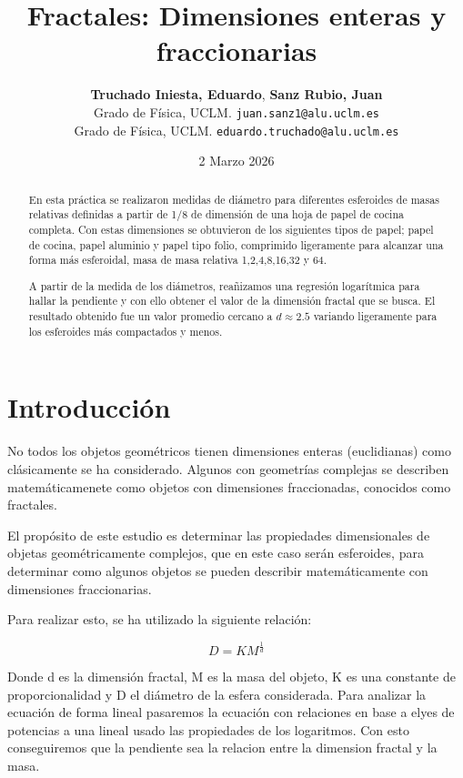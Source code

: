 \documentclass[11pt, a4paper, twocolumn]{article}
\title{\textbf{\Large Fractales: Dimensiones enteras y fraccionarias}}
\author{
    \textbf{Truchado Iniesta, Eduardo}, \textbf{Sanz Rubio, Juan} \\
    \small Grado de Física, UCLM. \texttt{juan.sanz1@alu.uclm.es} \\
    \small Grado de Física, UCLM. \texttt{eduardo.truchado@alu.uclm.es}
}
\date{\small 2 Marzo 2026}
\begin{document}
\maketitle
\thispagestyle{fancy}


\begin{abstract}
En esta práctica se realizaron medidas de diámetro para diferentes esferoides de masas relativas definidas a partir de 1/8 de dimensión 
de una hoja de papel de cocina completa. Con estas dimensiones se obtuvieron de los siguientes tipos de papel; papel de cocina, 
papel aluminio y papel tipo folio, comprimido ligeramente para alcanzar una forma más esferoidal, masa de masa relativa 1,2,4,8,16,32 y 64. 

\vspace{0.2cm}

A partir de la medida de los diámetros, reañizamos una regresión logarítmica para hallar la pendiente y con ello obtener el valor de la dimensión
fractal que se busca. El resultado obtenido fue un valor promedio cercano a $d\approx 2.5$ variando ligeramente para los esferoides más compactados y menos.
\end{abstract}



\section{Introducción}
No todos los objetos geométricos tienen dimensiones enteras (euclidianas) como clásicamente se ha considerado. Algunos con geometrías complejas se describen matemáticamenete 
como objetos con dimensiones fraccionadas, conocidos como fractales. 

\vspace{0.2cm}

El propósito de este estudio es determinar las propiedades dimensionales de objetas
geométricamente complejos, que en este caso serán esferoides, para determinar como
algunos objetos se pueden describir matemáticamente con dimensiones fraccionarias.

\vspace{0.2cm}

Para realizar esto, se ha utilizado la siguiente relación:

\begin{equation}
    D = K M ^{\frac{1}{d}}
\end{equation}

Donde d es la dimensión fractal, M es la masa del objeto, K es una constante de proporcionalidad y D el diámetro de la esfera considerada. Para
analizar la ecuación de forma lineal pasaremos la ecuación con relaciones en base a elyes de potencias a una lineal usado las propiedades de los
logaritmos. Con esto conseguiremos que la pendiente sea la relacion entre la dimension fractal y la masa. 
\end{document}
